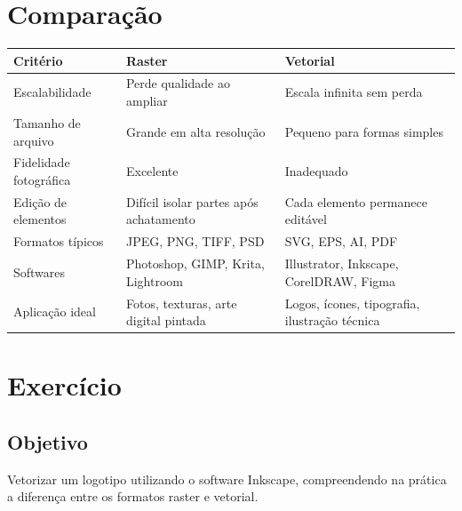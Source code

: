 \documentclass[a4paper,12pt]{article}
\begin{document}
\section{Comparação}

\begin{center}
\begin{tabular}{|p{}|p{}|p{}|}
\hline
\textbf{Critério} & \textbf{Raster} & \textbf{Vetorial} \\
\hline
Escalabilidade & Perde qualidade ao ampliar & Escala infinita sem perda \\
\hline
Tamanho de arquivo & Grande em alta resolução & Pequeno para formas simples \\
\hline
Fidelidade fotográfica & Excelente & Inadequado \\
\hline
Edição de elementos & Difícil isolar partes após achatamento & Cada elemento permanece editável \\
\hline
Formatos típicos & JPEG, PNG, TIFF, PSD & SVG, EPS, AI, PDF \\
\hline
Softwares & Photoshop, GIMP, Krita, Lightroom & Illustrator, Inkscape, CorelDRAW, Figma \\
\hline
Aplicação ideal & Fotos, texturas, arte digital pintada & Logos, ícones, tipografia, ilustração técnica \\
\hline
\end{tabular}
\end{center}

\section{Exercício}

\subsection*{Objetivo}
Vetorizar um logotipo utilizando o software Inkscape, compreendendo na prática a diferença entre os formatos raster e vetorial.
\end{document}
